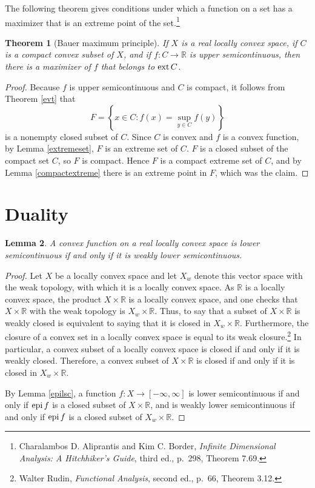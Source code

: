 \documentclass{article}
\newcommand{\epi}{\ensuremath\mathrm{epi}\,}
\newcommand{\ext}{\ensuremath\mathrm{ext}\,}
\newtheorem{theorem}{Theorem}
\newtheorem{lemma}[theorem]{Lemma}
\theoremstyle{definition}
\begin{document}
The following theorem gives conditions under which  a function on a set has a maximizer that  is  an extreme point of the set.\footnote{Charalambos D. Aliprantis and Kim C. Border,
{\em Infinite Dimensional Analysis: A Hitchhiker's Guide}, third ed., p.~298, Theorem 7.69.}


\begin{theorem}[Bauer maximum principle]
If $X$ is a real locally convex  space, if $C$ is a compact convex subset of $X$, and if
$f:C \to \mathbb{R}$ is upper semicontinuous, then there is a maximizer of $f$ that belongs to $\ext C$.
\end{theorem}
\begin{proof}
Because $f$ is upper semicontinuous and $C$ is compact, it follows from Theorem \ref{evt} that 
\[
F=\left\{x \in C: f(x) = \sup_{y \in C} f(y) \right\}
\]
is a nonempty closed subset of $C$.  Since $C$ is convex and $f$ is a convex function, by Lemma \ref{extremeset}, $F$ is an extreme
set of $C$. $F$ is a closed subset of the compact set $C$, so $F$ is compact. Hence $F$ is a compact extreme set of $C$, and
by Lemma \ref{compactextreme} there is an extreme point in $F$, which was the claim.
\end{proof}


\section{Duality}
\begin{lemma}
A  convex function on a real locally convex space is lower semicontinuous if and only if it is weakly  lower semicontinuous.
\label{weaklylsc}
\end{lemma}
\begin{proof}
Let $X$ be a locally convex space and let
$X_w$ denote this vector space with the weak topology, with which it is a locally convex space.
As $\mathbb{R}$ is a locally convex space, the product $X \times \mathbb{R}$ is a locally convex space, and one checks that
 $X \times \mathbb{R}$ with the weak topology is $X_w \times \mathbb{R}$. 
Thus, to say that a subset of $X \times \mathbb{R}$ is weakly closed is equivalent to saying that it is closed
in $X_w \times \mathbb{R}$.  
Furthermore, the closure of a convex set in a locally convex space is equal to its weak closure.\footnote{Walter Rudin, {\em Functional Analysis}, second ed., p.~66, Theorem 3.12.}
In particular, a convex subset of a locally convex space is closed if and only if it is weakly closed.
Therefore, a convex subset of $X \times \mathbb{R}$ is closed if and only if it is  closed in $X_w \times \mathbb{R}$. 


By Lemma \ref{epilsc},
 a function $f:X \to [-\infty,\infty]$ is
lower semicontinuous if and only if $\epi f$ is a closed subset of $X \times \mathbb{R}$, and is weakly
lower semicontinuous if and only if $\epi f$ is a closed subset of $X_w \times \mathbb{R}$. 
\end{proof}
\end{document}
